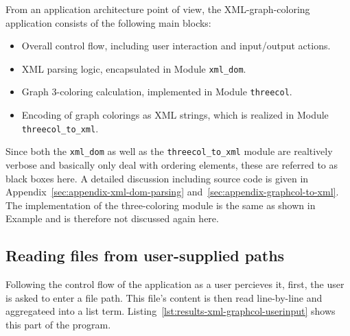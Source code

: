 From an application architecture point of view, the XML-graph-coloring application consists of the following main blocks:
\begin{itemize}
    \item Overall control flow, including user interaction and input/output actions.
    \item XML parsing logic, encapsulated in Module \texttt{xml\_dom}.
    \item Graph 3-coloring calculation, implemented in Module \texttt{threecol}.
    \item Encoding of graph colorings as XML strings, which is realized in Module \texttt{threecol\_to\_xml}.
\end{itemize}    
Since both the \texttt{xml\_dom} as well as the \texttt{threecol\_to\_xml} module are realtively verbose and basically only deal with ordering elements, these are referred to as black boxes here. A detailed discussion including source code is given in Appendix~\ref{sec:appendix-xml-dom-parsing} and~\ref{sec:appendix-graphcol-to-xml}. The implementation of the three-coloring module is the same as shown in Example and is therefore not discussed again here.

\subsection{Reading files from user-supplied paths}

Following the control flow of the application as a user percieves it, first, the user is asked to enter a file path. This file's content is then read line-by-line and aggregateed into a list term. Listing~\ref{lst:results-xml-graphcol-userinput} shows this part of the program.

